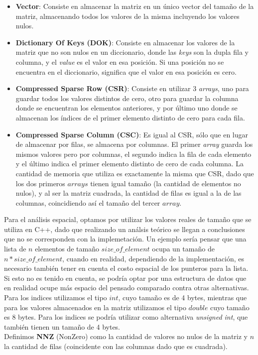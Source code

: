 \begin{itemize}
	\item \textbf{Vector}: Consiste en almacenar la matriz en un único vector del tamaño de la matriz, almacenando todos los valores de la misma incluyendo los valores nulos.  
	\item \textbf{Dictionary Of Keys (DOK)}: Consiste en almacenar los valores de la matriz que no son nulos en un diccionario, donde las \textit{keys} son la dupla fila y columna, y el \textit{value} es el valor en esa posición. Si una posición no se encuentra en el diccionario, significa que el valor en esa posición es cero.
	\item \textbf{Compressed Sparse Row (CSR)}: Consiste en utilizar 3 \textit{arrays}, uno para guardar todos los valores distintos de cero, otro para guardar la columna donde se encuentran los elementos anteriores, y por último uno donde se almacenan los índices de el primer elemento distinto de cero para cada fila.
	\item \textbf{Compressed Sparse Column (CSC)}: Es igual al CSR, sólo que en lugar de almacenar por filas, se almacena por columnas. El primer \textit{array} guarda los mismos valores pero por columnas, el segundo indica la fila de cada elemento y el último indica el primer elemento distinto de cero de cada columna. La cantidad de memoria que utiliza es exactamente la misma que CSR, dado que los dos primeros $arrays$ tienen igual tamaño (la cantidad de elementos no nulos), y al ser la matriz cuadrada, la cantidad de filas es igual a la de las columnas, coincidiendo así el tamaño del tercer $array$.
\end{itemize}

Para el análisis espacial, optamos por utilizar los valores reales de tamaño que se utiliza en C++, dado que realizando un análsis teórico se llegan a conclusiones que no se corresponden con la implemetación. Un ejemplo sería pensar que una lista de $n$ elementos de tamaño $size\_of\_element$ ocupa un tamaño de $n*size\_of\_element$, cuando en realidad, dependiendo de la implementación, es necesario también tener en cuenta el costo espacial de los punteros para la lista. Si esto no es tenido en cuenta, se podría optar por una estructura de datos que en realidad ocupe más espacio del pensado comparado contra otras alternativas. \\
Para los indices utilizamos el tipo $int$, cuyo tamaño es de 4 bytes, mientras que para los valores almacenados en la matriz utilizamos el tipo $double$ cuyo tamaño es 8 bytes. Para los indices se podría utilizar como alternativa \textit{unsigned int}, que también tienen un tamaño de 4 bytes.\\
Definimos \textbf{NNZ} (NonZero) como la cantidad de valores no nulos de la matriz y $n$ la cantidad de filas (coincidente con las columnas dado que es cuadrada). \\


